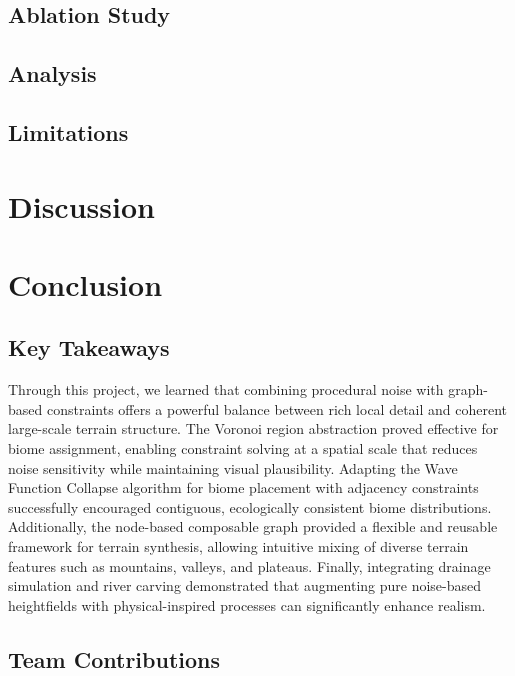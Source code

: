 \documentclass[12pt]{article}
\begin{document}
\subsection{Ablation Study}

\subsection{Analysis}

\subsection{Limitations}


\section{Discussion}



\section{Conclusion}

\subsection{Key Takeaways}
Through this project, we learned that combining procedural noise with graph-based constraints offers a powerful balance between rich local detail and coherent large-scale terrain structure. The Voronoi region abstraction proved effective for biome assignment, enabling constraint solving at a spatial scale that reduces noise sensitivity while maintaining visual plausibility. Adapting the Wave Function Collapse algorithm for biome placement with adjacency constraints successfully encouraged contiguous, ecologically consistent biome distributions. Additionally, the node-based composable graph provided a flexible and reusable framework for terrain synthesis, allowing intuitive mixing of diverse terrain features such as mountains, valleys, and plateaus. Finally, integrating drainage simulation and river carving demonstrated that augmenting pure noise-based heightfields with physical-inspired processes can significantly enhance realism.

\subsection{Team Contributions}
\end{document}
